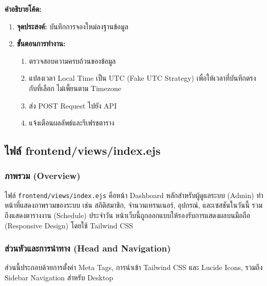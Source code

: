 \textbf{คำอธิบายโค้ด:}
\begin{enumerate}
    \item \textbf{จุดประสงค์:} บันทึกการจองใหม่ลงฐานข้อมูล
    \item \textbf{ขั้นตอนการทำงาน:}
    \begin{enumerate}
        \item ตรวจสอบความครบถ้วนของข้อมูล
        \item \begin{sloppypar}
แปลงเวลา Local Time เป็น UTC (Fake UTC Strategy) เพื่อให้เวลาที่บันทึกตรงกับที่เลือก ไม่เพี้ยนตาม Timezone
\end{sloppypar}
        \item ส่ง POST Request ไปยัง API
        \item แจ้งเตือนผลลัพธ์และรีเฟรชตาราง
    \end{enumerate}
\end{enumerate}


\subsection{ไฟล์ frontend/views/index.ejs}

\subsubsection{ภาพรวม (Overview)}
\begin{sloppypar}
ไฟล์ \texttt{frontend/views/index.ejs} คือหน้า Dashboard หลักสำหรับผู้ดูแลระบบ (Admin) ทำหน้าที่แสดงภาพรวมของระบบ เช่น สถิติสมาชิก, จำนวนเทรนเนอร์, อุปกรณ์, และเซสชันในวันนี้ รวมถึงแสดงตารางงาน (Schedule) ประจำวัน หน้าเว็บนี้ถูกออกแบบให้รองรับการแสดงผลบนมือถือ (Responsive Design) โดยใช้ Tailwind CSS
\end{sloppypar}

\subsubsection{ส่วนหัวและการนำทาง (Head and Navigation)}
ส่วนนี้ประกอบด้วยการตั้งค่า Meta Tags, การนำเข้า Tailwind CSS และ Lucide Icons, รวมถึง Sidebar Navigation สำหรับ Desktop

